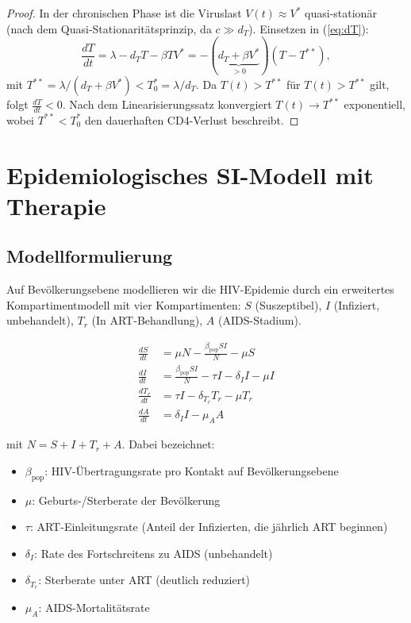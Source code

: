 ﻿\documentclass[a4paper,12pt]{article}
\theoremstyle{definition}
\begin{document}
\begin{proof}
In der chronischen Phase ist die Viruslast $V(t) \approx V^*$ quasi-station\"ar
(nach dem Quasi-Stationarit\"atsprinzip, da $c \gg d_T$).
Einsetzen in (\ref{eq:dT}):
\[
\frac{dT}{dt} = \lambda - d_T T - \beta T V^* = -(\underbrace{d_T + \beta V^*}_{>0})(T - T^{**}),
\]
mit $T^{**} = \lambda / (d_T + \beta V^*) < T_0^* = \lambda / d_T$.
Da $T(t) > T^{**}$ f\"ur $T(t) > T^{**}$ gilt, folgt $\frac{dT}{dt} < 0$.
Nach dem Linearisierungssatz konvergiert $T(t) \to T^{**}$ exponentiell,
wobei $T^{**} < T_0^*$ den dauerhaften CD4-Verlust beschreibt.
\end{proof}

\section{Epidemiologisches SI-Modell mit Therapie}

\subsection{Modellformulierung}

Auf Bev\"olkerungsebene modellieren wir die HIV-Epidemie durch ein erweitertes
Kompartimentmodell mit vier Kompartimenten:
$S$ (Suszeptibel), $I$ (Infiziert, unbehandelt), $T_r$ (In ART-Behandlung), $A$ (AIDS-Stadium).

\begin{align}
\frac{dS}{dt}   &= \mu N - \frac{\beta_{\text{pop}} S I}{N} - \mu S
                   \label{eq:sir_S} \\
\frac{dI}{dt}   &= \frac{\beta_{\text{pop}} S I}{N} - \tau I - \delta_I I - \mu I
                   \label{eq:sir_I} \\
\frac{dT_r}{dt} &= \tau I - \delta_{T_r} T_r - \mu T_r
                   \label{eq:sir_Tr} \\
\frac{dA}{dt}   &= \delta_I I - \mu_A A
                   \label{eq:sir_A}
\end{align}

mit $N = S + I + T_r + A$. Dabei bezeichnet:
\begin{itemize}
\item $\beta_{\text{pop}}$: HIV-\"Ubertragungsrate pro Kontakt auf Bev\"olkerungsebene
\item $\mu$: Geburts-/Sterberate der Bev\"olkerung
\item $\tau$: ART-Einleitungsrate (Anteil der Infizierten, die j\"ahrlich ART beginnen)
\item $\delta_I$: Rate des Fortschreitens zu AIDS (unbehandelt)
\item $\delta_{T_r}$: Sterberate unter ART (deutlich reduziert)
\item $\mu_A$: AIDS-Mortalit\"atsrate
\end{itemize}
\end{document}
